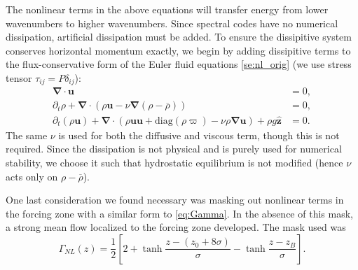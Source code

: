 \documentclass[
        fleqn,
        usenatbib,
        referee,
    ]{mnras}
\newcommand*{\s}[1]{\left[#1\right]}
\newcommand*{\bm}[1]{\mathbf{#1}}
\newcommand*{\uv}[1]{\hat{\mathbf{#1}}}
\begin{document}
The nonlinear terms in the above equations will transfer energy from lower
wavenumbers to higher wavenumbers. Since spectral codes have no numerical
dissipation, artificial dissipation must be added. To ensure the dissipitive
system conserves horizontal momentum exactly, we begin by adding dissipitive
terms to the flux-conservative form of the Euler fluid equations
\autoref{se:nl_orig} (we use stress tensor $\tau_{ij} = P\delta_{ij}$):
\begin{subequations}
    \begin{align}
        \bm{\nabla} \cdot \bm{u} &= 0,\\
        \partial_t \rho + \bm{\nabla} \cdot (\rho \bm{u} - \nu
            \bm{\nabla}(\rho - \overline{\rho})) &= 0,\label{eq:visc_cons_mom}\\
        \partial_t (\rho \bm{u}) + \bm{\nabla} \cdot (\rho \bm{u} \bm{u}
            + \mathrm{diag}(\rho \varpi)
            - \nu \rho \bm{\nabla}\bm{u})
            + \rho g \uv{z} &= 0.
    \end{align}
\end{subequations}
The same $\nu$ is used for both the diffusive and viscous term, though this is
not required. Since the dissipation is not physical and is purely used for
numerical stability, we choose it such that hydrostatic equilibrium is not
modified (hence $\nu$ acts only on $\rho - \overline{\rho}$).

One last consideration we found necessary was masking out nonlinear terms in the
forcing zone with a similar form to \autoref{eq:Gamma}. In the absence of this
mask, a strong mean flow localized to the forcing zone developed. The mask used
was
\begin{equation}
    \Gamma_{NL}(z) = \frac{1}{2}\s{2
        + \tanh \frac{z - (z_0 + 8\sigma)}{\sigma}
        - \tanh \frac{z - z_B}{\sigma}}.
\end{equation}
\end{document}
